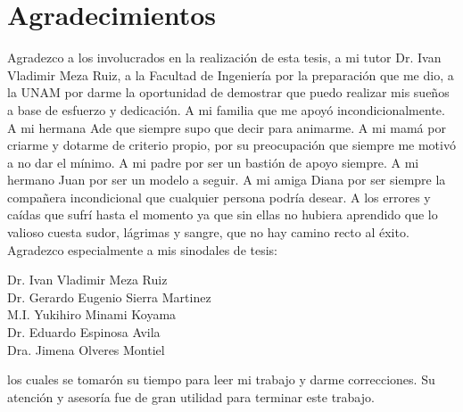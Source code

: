\chapter*{Agradecimientos}

\justify Agradezco a los involucrados en la realización de esta tesis, a mi tutor Dr. Ivan Vladimir Meza Ruiz, a la Facultad de Ingeniería por la preparación que me dio, a la UNAM por darme la oportunidad de demostrar que puedo realizar mis sueños a base de esfuerzo y dedicación. A mi familia que me apoyó incondicionalmente. A mi hermana Ade que siempre supo que decir para animarme. A mi mamá por criarme y dotarme de criterio propio, por su preocupación que siempre me motivó a no dar el mínimo. A mi padre por ser un bastión de apoyo siempre. A mi hermano Juan por ser un modelo a seguir. A mi amiga Diana por ser siempre la compañera incondicional que cualquier persona podría desear. A los errores y caídas que sufrí hasta el momento ya que sin ellas no hubiera aprendido que lo valioso cuesta sudor, lágrimas y sangre, que no hay camino recto al éxito.
\justify Agradezco especialmente a mis sinodales de tesis:
\begin{center}
	Dr. Ivan Vladimir Meza Ruiz\\
	Dr. Gerardo Eugenio Sierra Martinez\\
	M.I. Yukihiro Minami Koyama\\
	Dr. Eduardo Espinosa Avila\\
	Dra. Jimena Olveres Montiel\\
\end{center}
\justify los cuales se tomarón su tiempo para leer mi trabajo y darme correcciones. Su atención y asesoría fue de gran utilidad para terminar este trabajo.